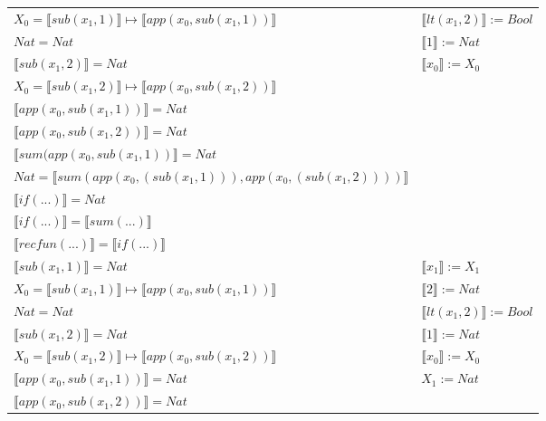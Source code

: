 \begin{exercise}
\begin{description}
\begin{center}
\begin{longtable}{ | l | l | }
                        $X_0 =  \llbracket sub(x_1,1) \rrbracket \mapsto  \llbracket app(x_0, sub(x_1,1)) \rrbracket$ &  $ \llbracket lt(x_1 , 2) \rrbracket := Bool$ \\
                        $Nat = Nat$ & $ \llbracket 1 \rrbracket := Nat$ \\
                        $ \llbracket sub(x_1,2) \rrbracket = Nat$ & $ \llbracket x_0 \rrbracket := X_0$ \\
                        $X_0 =  \llbracket sub(x_1,2) \rrbracket \mapsto  \llbracket app(x_0, sub(x_1,2)) \rrbracket$ &  \\
                        $ \llbracket app(x_0, sub(x_1,1)) \rrbracket = Nat$ & \\
                        $ \llbracket app(x_0, sub(x_1,2)) \rrbracket = Nat$ & \\
                        $ \llbracket sum(app(x_0, sub(x_1,1)) \rrbracket = Nat$ & \\
                        $Nat =  \llbracket sum(app(x_0, (sub(x_1,1))), app(x_0, (sub(x_1,2)))) \rrbracket$ & \\
                        $ \llbracket if(...) \rrbracket = Nat$ & \\
                        $ \llbracket if(...) \rrbracket =  \llbracket sum(...) \rrbracket$ & \\
                        $ \llbracket recfun(...) \rrbracket =   \llbracket if(...) \rrbracket$ & \\
                    \hline 
                        $ \llbracket sub(x_1,1) \rrbracket = Nat$ &  $ \llbracket x_1 \rrbracket := X_1$ \\
                        $X_0 =  \llbracket sub(x_1,1) \rrbracket \mapsto  \llbracket app(x_0, sub(x_1,1)) \rrbracket$ & $ \llbracket 2 \rrbracket := Nat$ \\
                        $Nat = Nat$ & $ \llbracket lt(x_1 , 2) \rrbracket := Bool$ \\
                        $ \llbracket sub(x_1,2) \rrbracket = Nat$ & $ \llbracket 1 \rrbracket := Nat$ \\
                        $X_0 =  \llbracket sub(x_1,2) \rrbracket \mapsto  \llbracket app(x_0, sub(x_1,2)) \rrbracket$ & $ \llbracket x_0 \rrbracket := X_0$  \\
                        $ \llbracket app(x_0, sub(x_1,1)) \rrbracket = Nat$ & $X_1 := Nat$\\
                        $ \llbracket app(x_0, sub(x_1,2)) \rrbracket = Nat$ & \\

\end{longtable}
\end{center}
\end{description}
\end{exercise}
